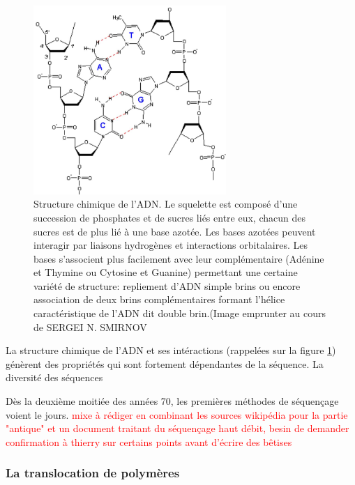 \documentclass[a4paper,11pt]{article}
\begin{document}
\begin{figure}[H]
\begin{center}
\includegraphics[width=0.65\textwidth]{adn.jpg}

\caption{Structure chimique de l'ADN. Le squelette est composé d'une succession de phosphates et de sucres liés entre eux, chacun des sucres est de plus lié à une base azotée. Les bases azotées peuvent interagir par liaisons hydrogènes et interactions orbitalaires. Les bases s'associent plus facilement avec leur complémentaire (Adénine et Thymine ou Cytosine et Guanine) permettant une certaine variété de structure: repliement d'ADN simple brins ou encore association de deux brins complémentaires formant l'hélice caractéristique de l'ADN dit double brin.(Image emprunter au cours de SERGEI N. SMIRNOV \cite{adnjpeg} }
\label{adn}
\end{center}
\end{figure}

La structure chimique de l'ADN et ses intéractions (rappelées sur la figure \ref{adn}) génèrent des propriétés qui sont fortement dépendantes de la séquence. La diversité des séquences 

Dès la deuxième moitiée des années 70, les premières méthodes de séquençage voient le jours.
\textcolor{red}{mixe à rédiger en combinant les sources wikipédia pour la partie "antique" et un document traitant du séquençage haut débit, besin de demander confirmation à thierry sur certains points avant d'écrire des b\^{e}tises}

\subsubsection{La translocation de polymères}
\end{document}
